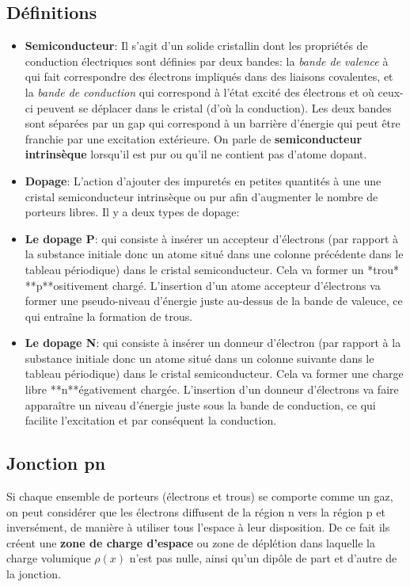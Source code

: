 \documentclass{book}
\begin{document}
            \subsection{Définitions}
                \begin{itemize}
                    \item \textbf{Semiconducteur}: Il s'agit d'un solide cristallin dont les propriétés de conduction électriques sont définies par deux bandes: la \textit{bande de valence} à qui fait correspondre des électrons impliqués dans des liaisons covalentes, et la \textit{bande de conduction} qui correspond à l'état excité des électrons et où ceux-ci peuvent se déplacer dans le cristal (d'où la conduction). Les deux bandes sont séparées par un gap qui correspond à un barrière d'énergie qui peut être franchie par une excitation extérieure. On parle de \textbf{semiconducteur intrinsèque} lorsqu'il est pur ou qu'il ne contient pas d'atome dopant.
                
                    \item \textbf{Dopage}: L'action d'ajouter des impuretés en petites quantités à une une cristal semiconducteur intrinsèque ou pur afin d'augmenter le nombre de porteurs libres. Il y a deux types de dopage:
                
                        \item  \textbf{Le dopage P}: qui consiste à insérer un accepteur d'électrons (par rapport à la substance initiale donc un atome situé dans une colonne précédente dans le tableau périodique) dans le cristal semiconducteur. Cela va former un *trou* **p**ositivement chargé. L'insertion d'un atome accepteur d'électrons va former une pseudo-niveau d'énergie juste au-dessus de la bande de valeuce, ce qui entraîne la formation de trous.
                
                        \item  \textbf{Le dopage N}: qui consiste à insérer un donneur d'électron (par rapport à la substance initiale donc un atome situé dans un colonne suivante dans le tableau périodique) dans le cristal semiconducteur. Cela va former une charge libre **n**égativement chargée. L'insertion d'un donneur d'électrons va faire apparaître un niveau d'énergie juste sous la bande de conduction, ce qui facilite l'excitation et par conséquent la conduction.\cite{Dopage}
                \end{itemize}

            \subsection{Jonction pn}
            Si chaque ensemble de porteurs (électrons et trous) se comporte comme un gaz, on peut considérer que les électrons diffusent de la région n vers la région p et inversément, de manière à utiliser tous l'espace à leur disposition. De ce fait ils créent une \textbf{zone de charge d'espace} ou zone de déplétion dans laquelle la charge volumique $\rho(x)$ n'est pas nulle, ainsi qu'un dipôle de part et d'autre de la jonction.
\end{document}

